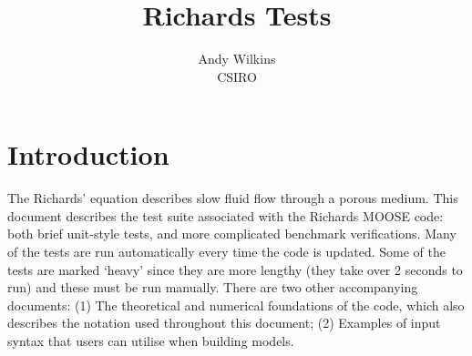 \documentclass[]{scrreprt}
\begin{document}
\title{Richards Tests}
\author{Andy Wilkins \\
CSIRO}
\maketitle

\tableofcontents

\chapter{Introduction}

The Richards' equation describes slow fluid flow through a porous
medium.  This document describes the test suite associated with the
Richards MOOSE code: both brief unit-style tests, and more complicated
benchmark verifications.  Many of the tests are run automatically
every time the code is updated.  Some of the tests are marked `heavy'
since they are more lengthy (they take over 2 seconds to run) and
these must be run manually.  There are two other accompanying documents:
(1) The theoretical and numerical foundations of the code, which also
describes the notation used throughout this document; (2) Examples of
input syntax that users can utilise when building models.
\end{document}

